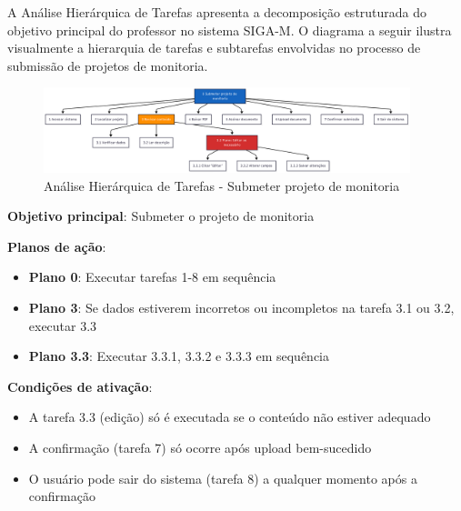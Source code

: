 \documentclass[12pt, a4paper]{report}
\begin{document}
A Análise Hierárquica de Tarefas apresenta a decomposição estruturada do objetivo principal do professor no sistema SIGA-M. O diagrama a seguir ilustra visualmente a hierarquia de tarefas e subtarefas envolvidas no processo de submissão de projetos de monitoria.

\begin{figure}[H]
\centering
\includegraphics[width=0.95\textwidth]{hta.png}
\caption{Análise Hierárquica de Tarefas - Submeter projeto de monitoria}
\label{fig:hta-diagram}
\end{figure}

\textbf{Objetivo principal}: Submeter o projeto de monitoria

\textbf{Planos de ação}:
\begin{itemize}
    \item \textbf{Plano 0}: Executar tarefas 1-8 em sequência
    \item \textbf{Plano 3}: Se dados estiverem incorretos ou incompletos na tarefa 3.1 ou 3.2, executar 3.3
    \item \textbf{Plano 3.3}: Executar 3.3.1, 3.3.2 e 3.3.3 em sequência
\end{itemize}

\textbf{Condições de ativação}:
\begin{itemize}
    \item A tarefa 3.3 (edição) só é executada se o conteúdo não estiver adequado
    \item A confirmação (tarefa 7) só ocorre após upload bem-sucedido
    \item O usuário pode sair do sistema (tarefa 8) a qualquer momento após a confirmação
\end{itemize}
\end{document}
